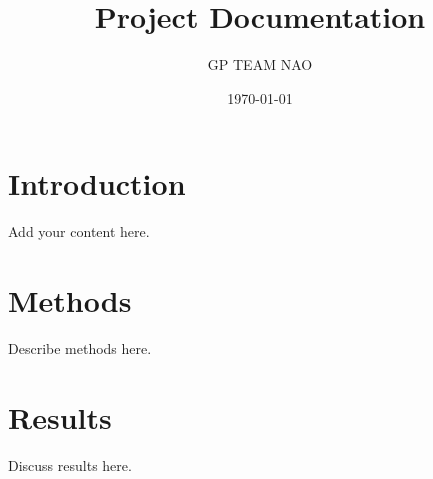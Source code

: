 \documentclass[a4paper,12pt]{article}
\title{Project Documentation}
\author{GP TEAM NAO}
\date{\today}
\begin{document}
\maketitle
\tableofcontents

\section{Introduction}
Add your content here.

\section{Methods}
Describe methods here.

\section{Results}
Discuss results here.
\end{document}
